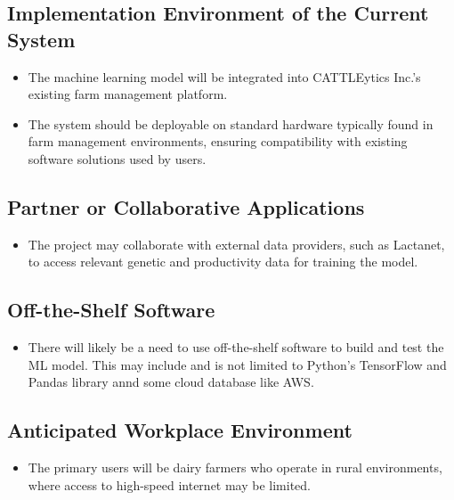 \documentclass[12pt]{article}
\begin{document}
\subsection{Implementation Environment of the Current System}
\begin{itemize}
    \item The machine learning model will be integrated into CATTLEytics Inc.'s 
    existing farm management platform.
    \item The system should be deployable on standard hardware typically found 
    in farm management environments, ensuring compatibility with existing 
    software solutions used by users.
\end{itemize}

\subsection{Partner or Collaborative Applications}
\begin{itemize}
    \item The project may collaborate with external data providers, such as 
    Lactanet, to access relevant genetic and productivity data for training the 
    model.
\end{itemize}

\subsection{Off-the-Shelf Software}
\begin{itemize}
    \item There will likely be a need to use off-the-shelf software to build 
    and test the ML model. This may include and is not limited to Python's 
    TensorFlow and Pandas library annd some cloud database like AWS. 
\end{itemize}

\subsection{Anticipated Workplace Environment}
\begin{itemize}
    \item The primary users will be dairy farmers who operate in rural 
    environments, where access to high-speed internet may be limited.
\end{itemize}
\end{document}
